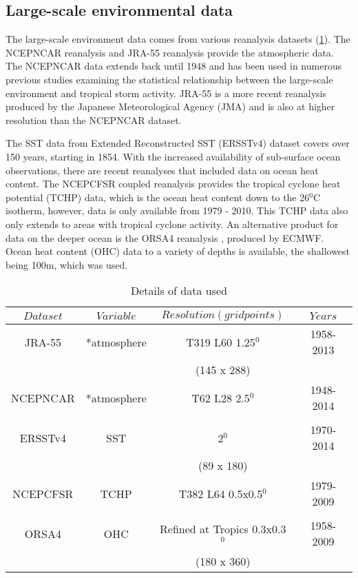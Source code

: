 \subsection{Large-scale environmental data}

The large-scale environment data comes from various reanalysis datasets (\ref{t1}). The NCEPNCAR reanalysis \citep{kalnay1996ncep} and JRA-55 reanalysis \citep{kobayashi2015jra} provide the atmospheric data. The NCEPNCAR data extends back until 1948 and has been used in numerous previous studies examining the statistical relationship between the large-scale environment and tropical storm activity. JRA-55 is a more recent reanalysis produced by the Japanese Meteorological Agency (JMA) and is also at higher resolution than the NCEPNCAR dataset.

The SST data from Extended Reconstructed SST (ERSSTv4) dataset \citep{huang2015extended} covers over 150 years, starting in 1854. With the increased availability of sub-surface ocean observations, there are recent reanalyses that included data on ocean heat content. The NCEPCFSR coupled reanalysis \citep{saha2010ncep} provides the tropical cyclone heat potential (TCHP) data, which is the ocean heat content down to the 26$^0$C isotherm, however, data is only available from 1979 - 2010. This TCHP data also only extends to areas with tropical cyclone activity. An alternative product for data on the deeper ocean is the ORSA4 reanalysis \citep{balmaseda2013evaluation}, produced by ECMWF. Ocean heat content (OHC) data to a variety of depths is available, the shallowest being 100m, which was used.


\begin{table}[h]
	\caption{Details of data used}\label{t1}
	\begin{center}
		\begin{tabular}{cccc}
			\hline\hline
			$Dataset$ & $Variable$ & $Resolution (grid points)$ & $Years$ \\
			\hline
			JRA-55 & *atmosphere & T319 L60 1.25$^0$ & 1958-2013 \\ %
			\citep{kobayashi2015jra} & & (145 x 288) & \\
			NCEPNCAR & *atmosphere & T62 L28 2.5$^0$ & 1948-2014 \\
			\citep{kalnay1996ncep} & & & \\
			ERSSTv4 & SST & 2$^0$ & 1970-2014 \\
			\citep{huang2015extended} & & (89 x 180) & \\
			NCEPCFSR & TCHP & T382 L64 0.5x0.5$^0$ & 1979-2009  \\
			\citep{saha2010ncep} & & & \\
			ORSA4 & OHC & Refined at Tropics 0.3x0.3$^0$ & 1958-2009  \\
			\citep{balmaseda2013evaluation} & & (180 x 360) & \\
			
			\hline
		\end{tabular}
	\end{center}
\end{table}

